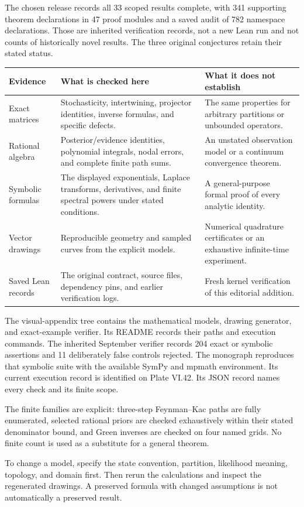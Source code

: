 The chosen release records all 33 scoped results complete, with 341 supporting theorem declarations in 47 proof modules and a saved audit of 782 namespace declarations. Those are inherited verification records, not a new Lean run and not counts of historically novel results. The three original conjectures retain their stated status.
\begin{tabularx}{\linewidth}{@{}>{\raggedright\arraybackslash}p{1.22in}YY@{}}
\toprule
Evidence & What is checked here & What it does not establish\\
\midrule
Exact matrices & Stochasticity, intertwining, projector identities, inverse formulas, and specific defects. & The same properties for arbitrary partitions or unbounded operators.\\
Rational algebra & Posterior/evidence identities, polynomial integrals, nodal errors, and complete finite path sums. & An unstated observation model or a continuum convergence theorem.\\
Symbolic formulas & The displayed exponentials, Laplace transforms, derivatives, and finite spectral powers under stated conditions. & A general-purpose formal proof of every analytic identity.\\
Vector drawings & Reproducible geometry and sampled curves from the explicit models. & Numerical quadrature certificates or an exhaustive infinite-time experiment.\\
Saved Lean records & The original contract, source files, dependency pins, and earlier verification logs. & Fresh kernel verification of this editorial addition.\\
\bottomrule
\end{tabularx}
The visual-appendix tree contains the mathematical models, drawing generator, and exact-example verifier. Its README records their paths and execution commands. The inherited September verifier records 204 exact or symbolic assertions and 11 deliberately false controls rejected. The monograph reproduces that symbolic suite with the available SymPy and mpmath environment. Its current execution record is identified on Plate VI.42. Its JSON record names every check and its finite scope.

The finite families are explicit: three-step Feynman--Kac paths are fully enumerated, selected rational priors are checked exhaustively within their stated denominator bound, and Green inverses are checked on four named grids. No finite count is used as a substitute for a general theorem.

To change a model, specify the state convention, partition, likelihood meaning, topology, and domain first. Then rerun the calculations and inspect the regenerated drawings. A preserved formula with changed assumptions is not automatically a preserved result.
